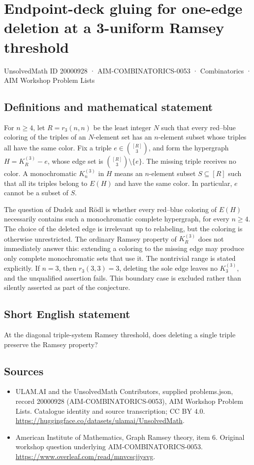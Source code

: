 \documentclass[11pt,a4paper]{article}
\begin{document}
\section*{Endpoint-deck gluing for one-edge deletion at a 3-uniform Ramsey threshold}\label{20000928}
{\small UnsolvedMath ID 20000928 · AIM-COMBINATORICS-0053 · Combinatorics · AIM Workshop Problem Lists}
\subsection{Definitions and mathematical statement}
For $n\ge4$, let $R=r_3(n,n)$ be the least integer $N$ such that every
red--blue coloring of the triples of an $N$-element set has an
$n$-element subset whose triples all have the same color.
Fix a triple $e\in\binom{[R]}3$, and form the hypergraph
$H=K_R^{(3)}-e$, whose edge set is
$\binom{[R]}3\setminus\{e\}$. The missing triple receives no color.
A monochromatic $K_n^{(3)}$ in $H$ means an $n$-element subset
$S\subseteq[R]$ such that all its triples belong to $E(H)$ and have
the same color. In particular, $e$ cannot be a subset of $S$.

The question of Dudek and R\"odl is whether every red--blue coloring
of $E(H)$ necessarily contains such a monochromatic complete
hypergraph, for every $n\ge4$. The choice of the deleted edge is
irrelevant up to relabeling, but the coloring is otherwise unrestricted.
The ordinary Ramsey property of $K_R^{(3)}$ does not immediately
answer this: extending a coloring to the missing edge may produce
only complete monochromatic sets that use it.
The nontrivial range is stated explicitly. If $n=3$, then
$r_3(3,3)=3$, deleting the sole edge leaves no $K_3^{(3)}$, and the
unqualified assertion fails. This boundary case is excluded rather
than silently asserted as part of the conjecture.
\subsection{Short English statement}
At the diagonal triple-system Ramsey threshold, does deleting a single triple preserve the Ramsey property?
\subsection{Sources}
\begin{itemize}
\item[S1] ULAM.AI and the UnsolvedMath Contributors, supplied problems.json, record 20000928 (AIM-COMBINATORICS-0053), AIM Workshop Problem Lists. Catalogue identity and source transcription; CC BY 4.0.
\url{https://huggingface.co/datasets/ulamai/UnsolvedMath}.
\item[S2] American Institute of Mathematics, Graph Ramsey theory, item 6. Original workshop question underlying AIM-COMBINATORICS-0053.
\url{https://www.overleaf.com/read/mnvcscjjysvg}.
\end{itemize}
\end{document}

